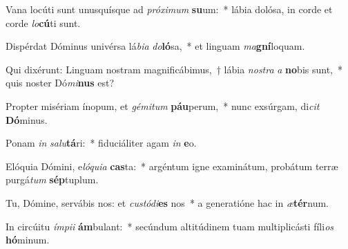 \item Vana locúti sunt unusquísque ad \textit{pró}\textit{xi}\textit{mum} \textbf{su}um:~* lábia dolósa, in corde et corde \textit{lo}\textbf{cú}ti sunt.
\item Dispérdat Dóminus univérsa lá\textit{bi}\textit{a} \textit{do}\textbf{ló}sa,~* et linguam \textit{ma}\textbf{gní}loquam.
\item Qui dixérunt: Linguam nostram magnificábimus,~† lábia \textit{nos}\textit{tra} \textit{a} \textbf{no}bis sunt,~* quis noster Dó\textit{mi}\textbf{nus} est?
\item Propter misériam ínopum, et \textit{gé}\textit{mi}\textit{tum} \textbf{páu}perum,~* nunc exsúrgam, di\textit{cit} \textbf{Dó}minus.
\item Ponam \textit{in} \textit{sa}\textit{lu}\textbf{tá}ri:~* fiduciáliter agam \textit{in} \textbf{e}o.
\item Elóquia Dómini, e\textit{ló}\textit{qui}\textit{a} \textbf{cas}ta:~* argéntum igne examinátum, probátum terræ purgá\textit{tum} \textbf{sép}tuplum.
\item Tu, Dómine, servábis nos: et \textit{cus}\textit{tó}\textit{di}\textbf{es} nos~* a generatióne hac in \textit{æ}\textbf{tér}num.
\item In circúitu \textit{ím}\textit{pi}\textit{i} \textbf{ám}bulant:~* secúndum altitúdinem tuam multiplicásti fíli\textit{os} \textbf{hó}minum.
